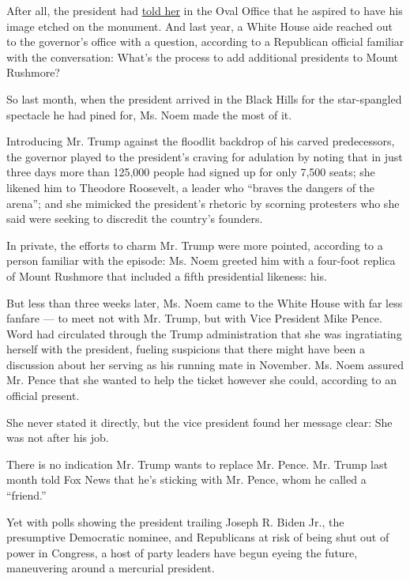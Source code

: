 After all, the president had
\href{https://www.argusleader.com/story/news/2018/04/24/president-donald-trump-mount-rushmore-trumpmore/544597002/}{told
her} in the Oval Office that he aspired to have his image etched on the
monument. And last year, a White House aide reached out to the
governor's office with a question, according to a Republican official
familiar with the conversation: What's the process to add additional
presidents to Mount Rushmore?

So last month, when the president arrived in the Black Hills for the
star-spangled spectacle he had pined for, Ms. Noem made the most of it.

Introducing Mr. Trump against the floodlit backdrop of his carved
predecessors, the governor played to the president's craving for
adulation by noting that in just three days more than 125,000 people had
signed up for only 7,500 seats; she likened him to Theodore Roosevelt, a
leader who ``braves the dangers of the arena''; and she mimicked the
president's rhetoric by scorning protesters who she said were seeking to
discredit the country's founders.

In private, the efforts to charm Mr. Trump were more pointed, according
to a person familiar with the episode: Ms. Noem greeted him with a
four-foot replica of Mount Rushmore that included a fifth presidential
likeness: his.

But less than three weeks later, Ms. Noem came to the White House with
far less fanfare --- to meet not with Mr. Trump, but with Vice President
Mike Pence. Word had circulated through the Trump administration that
she was ingratiating herself with the president, fueling suspicions that
there might have been a discussion about her serving as his running mate
in November. Ms. Noem assured Mr. Pence that she wanted to help the
ticket however she could, according to an official present.

She never stated it directly, but the vice president found her message
clear: She was not after his job.

There is no indication Mr. Trump wants to replace Mr. Pence. Mr. Trump
last month told Fox News that he's sticking with Mr. Pence, whom he
called a ``friend.''

Yet with polls showing the president trailing Joseph R. Biden Jr., the
presumptive Democratic nominee, and Republicans at risk of being shut
out of power in Congress, a host of party leaders have begun eyeing the
future, maneuvering around a mercurial president.

